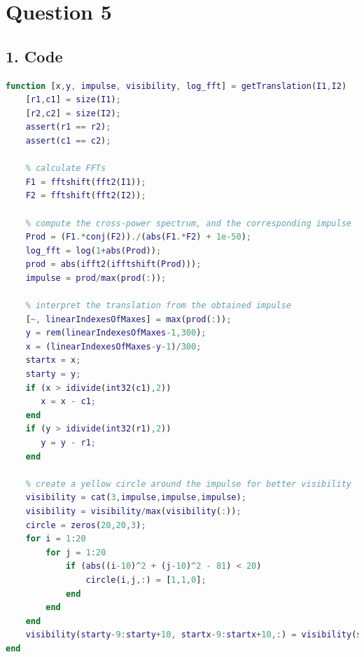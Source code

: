 \documentclass[12pt, a4paper]{article}
\begin{document}
\vspace*{-22pt}
\section*{Question 5}
\subsection*{1. Code}
\begin{lstlisting}[language=Matlab]
function [x,y, impulse, visibility, log_fft] = getTranslation(I1,I2)
    [r1,c1] = size(I1);
    [r2,c2] = size(I2);
    assert(r1 == r2);
    assert(c1 == c2);
    
    % calculate FFTs
    F1 = fftshift(fft2(I1));
    F2 = fftshift(fft2(I2));
    
    % compute the cross-power spectrum, and the corresponding impulse
    Prod = (F1.*conj(F2))./(abs(F1.*F2) + 1e-50);
    log_fft = log(1+abs(Prod));
    prod = abs(ifft2(ifftshift(Prod)));
    impulse = prod/max(prod(:));
    
    % interpret the translation from the obtained impulse
    [~, linearIndexesOfMaxes] = max(prod(:));
    y = rem(linearIndexesOfMaxes-1,300);
    x = (linearIndexesOfMaxes-y-1)/300;
    startx = x;
    starty = y;
    if (x > idivide(int32(c1),2))
       x = x - c1;
    end
    if (y > idivide(int32(r1),2))
       y = y - r1;
    end
    
    % create a yellow circle around the impulse for better visibility
    visibility = cat(3,impulse,impulse,impulse);
    visibility = visibility/max(visibility(:));
    circle = zeros(20,20,3);
    for i = 1:20
        for j = 1:20
            if (abs((i-10)^2 + (j-10)^2 - 81) < 20)
                circle(i,j,:) = [1,1,0];
            end
        end
    end
    visibility(starty-9:starty+10, startx-9:startx+10,:) = visibility(starty-9:starty+10, startx-9:startx+10,:) + circle;
end
\end{lstlisting}
\newpage
\end{document}

